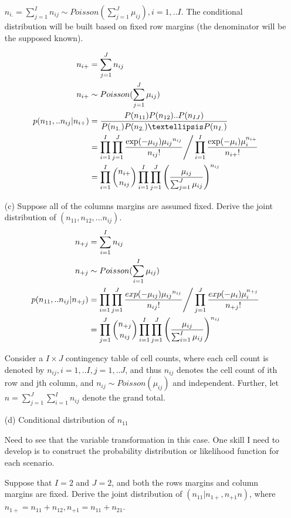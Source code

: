 \begin{itemize}
	$n_{i .} = \sum_{j=1}^I n_{ij} \sim Poisson(\sum_{j=1}^J \mu_{ij}), i= 1,..I$. The conditional distribution will be built based on fixed row margins (the denominator will be the supposed known). 
	
\begin{align*}
	n_{i+} &= \sum_{j=1}^J n_{ij}\\
	n_{i+} & \sim Poisson (\sum_{j=1}^J \mu_{ij})\\
	p(n_{11},..n_{ij}|n_{i+}) &= \frac{P(n_{11}) P(n_{12}).. P(n_{IJ})}{P(n_{1.}) P(n_{2.})… P(n_{I.})} \\
	&= \prod_{i=1}^I \prod_{j=1}^J \frac{\exp(-\mu_{ij})  {\mu_{ij}}^{n_{ij}}}{n_{ij}!} \Bigg{/} \prod_{i=1}^I \frac{\exp(-\mu_i) \mu_i^{n_{i+}}}{n_{i+}!}\\
	&= \prod_{i=1}^I {n_{i+} \choose n_{ij}} \prod_{i=1}^I \prod_{j=1}^J \left( \frac{\mu_{ij}}{\sum_{j=1}^J \mu_{ij}} \right)^{n_{ij}}
\end{align*}

	\item [(c)] Suppose all of the columns margins are assumed fixed. Derive the joint distribution of $(n_{11}, n_{12},... n_{ij})$.
\begin{align*}
	n_{+j} &= \sum_{i=1}^I n_{ij}\\
	n_{+j} & \sim Poisson (\sum_{i=1}^I \mu_{ij})\\
	p(n_{11},..n_{ij}|n_{+j}) &= \prod_{i=1}^I \prod_{j=1}^J \frac{exp(-\mu_{ij})  {\mu_{ij}}^{n_{ij}}}{n_{ij}!} \Bigg{/} \prod_{j=1}^J \frac{exp(-\mu_i) \mu_i^{n_{+j}}}{n_{+j}!}\\
	&= \prod_{j=1}^J {n_{+j} \choose n_{ij}} \prod_{i=1}^I \prod_{j=1}^J \left( \frac{\mu_{ij}}{\sum_{i=1}^I \mu_{ij}} \right)^{n_{ij}}
\end{align*}


Consider a $I \times J$ contingency table of cell counts, where each cell count is denoted by $n_{ij}, i=1,..I, j=1,..J$, and thus $n_{ij}$ denotes the cell count of ith row and jth column, and $n_{ij} \sim Poisson (\mu_{ij})$ and independent. Further, let $n= \sum_{j=1}^J \sum_{i=1}^I n_{ij}$ denote the grand total.

\item[(d)] Conditional distribution of $n_{11}$

	Need to see that the variable transformation in this case. One skill I need to develop is to construct the probability distribution or likelihood function for each scenario.
	
	Suppose that $I=2$ and $J=2$, and both the rows margins and column margins are fixed. Derive the joint distribution of $(n_{11}|n_{1+}, n_{+1} n)$, where $n_{1+} = n_{11} + n_{12}, n_{+1} = n_{11}+ n_{21}$.
	

\end{itemize}
